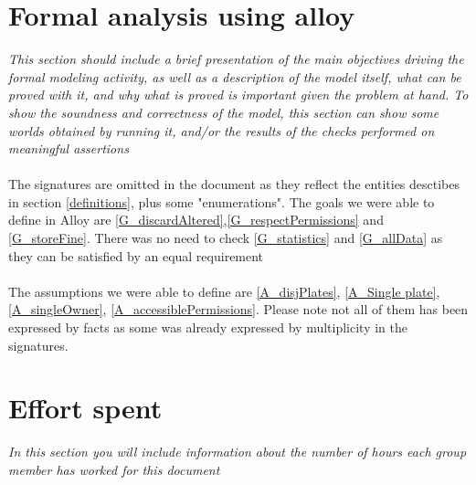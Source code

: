 \documentclass{article}
\begin{document}
\newpage
\section{Formal analysis using alloy} \textit{This section should include a brief presentation of the main objectives driving the formal modeling activity, as well as a description of the model itself, what can be proved with it, and why what is proved is important given the problem at hand. To show the soundness and correctness of the model, this section can show some worlds obtained by running it, and/or the results of the checks performed on meaningful assertions}
	\paragraph{}The signatures are omitted in the document as they reflect the entities 				desctibes in section \ref{definitions}, plus some "enumerations". The goals we were able to define in Alloy are \ref{G_discardAltered},\ref{G_respectPermissions} and \ref{G_storeFine}.
	There was no need to check \ref{G_statistics} and \ref{G_allData} as they can be satisfied 	by an equal requirement
	\paragraph{}The assumptions we were able to define are \ref{A_disjPlates}, \ref{A_Single plate}, \ref{A_singleOwner}, \ref{A_accessiblePermissions}. Please note not all of them has been expressed by facts as some was already expressed by multiplicity in the signatures.
	
\newpage
\section{Effort spent} \textit{In this section you will include information about the number of hours each group member has worked for this document}
\end{document}
